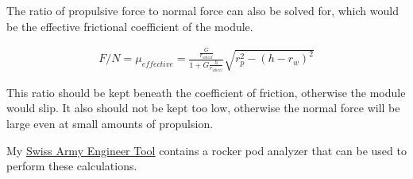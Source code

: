 \documentclass[10pt,letterpaper]{article}
\begin{document}
The ratio of propulsive force to normal force can also be solved for, which would be the effective frictional coefficient of the module.

\begin{align}
	F/N = \mu_{effective} = \frac{\frac{G}{r_{wheel}}}{ 1 + G \frac{h}{r_{wheel}} } \sqrt{r_{p}^2 - (h - r_{w})^2}
\end{align}

This ratio should be kept beneath the coefficient of friction, otherwise the module would slip. It also should not be kept too low, otherwise the normal force will be large even at small amounts of propulsion.

My \href{https://thaddeus-maximus.github.io/swissarmyengineer/rockerpod}{\color{red}\underline{Swiss Army Engineer Tool}} contains a rocker pod analyzer that can be used to perform these calculations.
	
\end{document}
